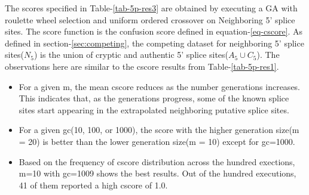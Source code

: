 The scores specified in Table-\ref{tab-5p-res3} are obtained by executing a GA with roulette wheel selection and uniform ordered crossover on Neighboring 5' splice sites. The score function is the confusion score defined in equation-\ref{eq-cscore}. As defined in section-\ref{sec:competing}, the competing dataset for neighboring 5' splice sites($N_5$) is the union of cryptic and authentic 5' splice sites($A_5 \cup C_5$). The observations here are similar to the cscore results from Table-\ref{tab-5p-res1}.
\begin{itemize}
	\item For a given m, the mean cscore reduces as the number generations increases. This indicates that, as the generations progress, some of the known splice sites start appearing in the extrapolated neighboring putative splice sites.
	\item For a given gc(10, 100, or 1000), the score with the higher generation size(m = 20) is better than the lower generation size(m = 10) except for gc=1000.
	\item Based on the frequency of cscore distribution across the hundred exections, m=10 with gc=1009 shows the best results. Out of the hundred executions, 41 of them reported a high cscore of 1.0.
\end{itemize}
